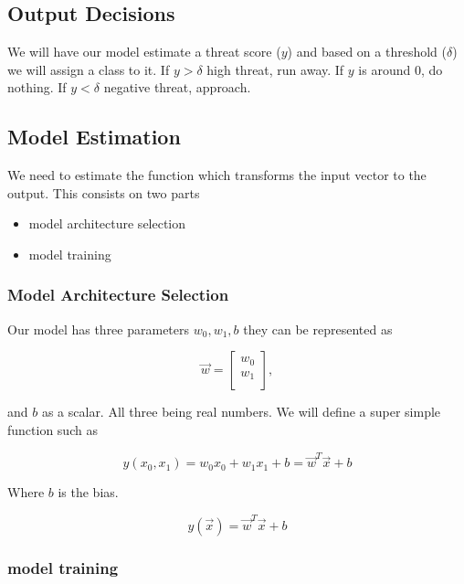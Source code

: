 \documentclass[twocolumn]{article}
\begin{document}
\subsection{Output Decisions}

We will have our model estimate a threat score ($y$) and based on a threshold
($\delta$) we will assign a class to it. If $y > \delta$ high threat, run away.
If $y$ is around 0, do nothing. If $y < \delta$ negative threat,
approach.

\subsection{Model Estimation}

We need to estimate the function which transforms the input vector to the
output. This consists on two parts

\begin{itemize}
  \item model architecture selection
  \item model training
\end{itemize}

\subsubsection{Model Architecture Selection}

Our model has three parameters $w_0, w_1, b$ they can be represented as

\begin{equation}
    \vec{w} = \begin{bmatrix}
                w_0 \\
                w_1 \\
              \end{bmatrix},
\end{equation}

and $b$ as a scalar. All three being real numbers. We will define a super
simple function such as

\noindent
\begin{equation}
    y(x_0, x_1) = w_0  x_0 + w_1  x_1 + b = \vec{w}^T\vec{x} + b
\end{equation}
\noindent

Where $b$ is the bias.

\begin{equation}
    y(\vec{x}) = \vec{w}^T\vec{x} + b
\end{equation}


\subsubsection{model training}
\end{document}
